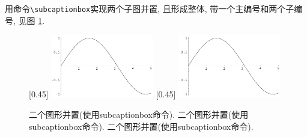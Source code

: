 \documentclass[Chinese]{APSart}
\begin{document}
\begin{example}
用命令\verb/\subcaptionbox/实现两个子图并置, 且形成整体, 带一个主编号和两个子编号, 见图 \ref{mini:subfigs}. 	

\begin{figure}[htbp] %
	\centering
	[0.45\textwidth]
		{\includegraphics[width=0.4\textwidth]{figs/sin.pdf}}
	[0.45\textwidth]
		{\includegraphics[width=0.4\textwidth]{figs/sin.pdf}}
	\caption{二个图形并置(使用subcaptionbox命令). 二个图形并置(使用subcaptionbox命令). 二个图形并置(使用subcaptionbox命令). }
	\label{mini:subfigs} %
\end{figure}

\end{example}
\end{document}

